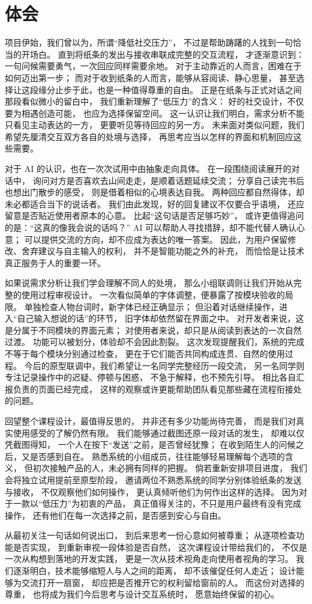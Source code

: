 
\chapter{体会}
\label{chap:reflection}

项目伊始，我们曾以为，所谓“降低社交压力”，
不过是帮助踌躇的人找到一句恰当的开场白。
直到将纸条的发出与接收串联成完整的交互流程，
才逐渐意识到：一句问候需要勇气，一次回应同样需要余地。
对于主动靠近的人而言，困难在于如何迈出第一步；
而对于收到纸条的人而言，能够从容阅读、静心思量，
甚至选择让这段缘分止步于此，也是一种值得尊重的自由。
正是在纸条与正式对话之间那段看似微小的留白中，
我们重新理解了“低压力”的含义：
好的社交设计，不仅要为相遇创造可能，
也应为选择保留空间。
这一认识让我们明白，需求分析不能只看见主动表达的一方，
更要听见等待回应的另一方。
未来面对类似问题，我们希望先厘清交互双方各自的处境与选择，
再思考应当以怎样的界面和机制回应这些需要。

对于 AI 的认识，也在一次次试用中由抽象走向具体。
在一段围绕阅读展开的对话中，
询问对方是否喜欢去山间走走，是顺着话题延续交流；
分享自己读完书后也想出门散步的感受，
则是借着相似的心境表达自我。
两种回应都自然得体，却未必都适合当下的说话者。
我们由此发现，好的回复建议不仅要合乎语境，
还应留意是否贴近使用者原本的心意。
比起“这句话是否足够巧妙”，
或许更值得追问的是：“这真的像我会说的话吗？”
AI 可以帮助人寻找措辞，却不能代替人确认心意；
可以提供交流的方向，却不应成为表达的唯一答案。
因此，为用户保留修改、舍弃建议与自主输入的权利，
并不是智能功能之外的补充，
而恰恰是让技术真正服务于人的重要一环。

如果说需求分析让我们学会理解不同人的处境，
那么小组联调则让我们开始从完整的使用过程审视设计。
一次看似简单的字体调整，便暴露了按模块验收的局限。
单独检查人物台词时，新字体已经正确显示；
但沿着对话继续操作，进入“自己输入想说的话”的环节，
旧字体却依然留在界面之中。
对开发者来说，这是分属于不同模块的界面元素；
对使用者来说，却只是从阅读到表达的一次自然过渡。
功能可以被划分，体验却不会因此割裂。
这次发现提醒我们，系统的完成不等于每个模块分别通过检查，
更在于它们能否共同构成连贯、自然的使用过程。
今后的原型联调中，我们希望让一名同学完整经历一段交流，
另一名同学则专注记录操作中的迟疑、停顿与困惑，
不急于解释，也不预先引导。
相比各自汇报负责的页面已经完成，
这样的观察或许更能帮助团队看见那些藏在流程衔接处的问题。

回望整个课程设计，最值得反思的，
并非还有多少功能尚待完善，
而是我们对真实使用感受的了解仍然有限。
我们能够通过截图还原一段对话的发生，
却难以仅凭截图得知，
一个人在按下“发送”之前，是否曾经犹豫；
在收到陌生人的问候之后，又是否感到自在。
熟悉系统的小组成员，往往能够轻易理解每个选项的含义，
但初次接触产品的人，未必拥有同样的把握。
倘若重新安排项目进度，
我们会将独立试用提前至原型阶段，
邀请两位不熟悉系统的同学分别体验纸条的发送与接收，
不仅观察他们如何操作，
更认真倾听他们为何作出这样的选择。
因为对于一款以“低压力”为初衷的产品，
真正值得关注的，不只是用户最终有没有完成操作，
还有他们在每一次选择之前，是否感到安心与自由。

从最初关注一句话如何说出口，
到后来思考一份心意如何被尊重；
从逐项检查功能是否实现，
到重新审视一段体验是否自然，
这次课程设计带给我们的，
不仅是一次从构想到落地的开发实践，
更是一次从技术视角走向使用者视角的学习。
我们逐渐明白，技术能够缩短人与人之间的距离，
却不该催促任何人走近；
设计能够为交流打开一扇窗，
却应把是否推开它的权利留给窗前的人。
而这份对选择的尊重，
也将成为我们今后思考与设计交互系统时，
愿意始终保留的初心。
